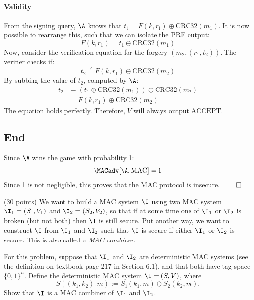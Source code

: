\documentclass[12pt]{article}
\begin{document}
\begin{solution}
\paragraph{Validity} From the signing query, $\A$ knows that $t_1 = F(k, r_1) \oplus \text{CRC32}(m_1)$. 
It is now possible to rearrange this, such that we can isolate the PRF output:
\begin{equation*}
    F(k, r_1) = t_1 \oplus \text{CRC32}(m_1)
\end{equation*}
Now, consider the verification equation for the forgery $(m_2, (r_1, t_2))$. The verifier checks if:
\begin{equation*}
    t_2 \stackrel{?}{=} F(k, r_1) \oplus \text{CRC32}(m_2)
\end{equation*}
By subbing the value of $t_2$, computed by $\A$:
\begin{equation*}
    \begin{aligned}
        t_2 &= (t_1 \oplus \text{CRC32}(m_1)) \oplus \text{CRC32}(m_2) \\
            &= F(k, r_1) \oplus \text{CRC32}(m_2)
    \end{aligned}
\end{equation*}
The equation holds perfectly. Therefore, $V$ will always output $\text{ACCEPT}$.

\subsection*{End}
Since $\A$ wins the game with probability 1:
\begin{equation*}
    \MACadv[\A, \text{MAC}] = 1
\end{equation*}
Since 1 is not negligible, this proves that the MAC protocol is insecure. $\qed$
\end{solution}


  
\begin{problem} (30 points)
We want to build a MAC system $\I$ using two MAC system $\I_1 = (S_1, V_1)$ and $\I_2 = (S_2, V_2)$, so that if at some time one of $\I_1$ or $\I_2$ is broken (but not both) then $\I$ is still secure.
Put another way, we want to construct $\I$ from $\I_1$ and $\I_2$ such that $\I$ is secure if either $\I_1$ or $\I_2$ is secure.
This is also called a \emph{MAC combiner}.

For this problem, suppose that $\I_1$ and $\I_2$ are deterministic MAC systems (see the definition on textbook page 217 in Section 6.1), and that both have tag space $\{0, 1\}^n$.
Define the deterministic MAC system $\I = (S, V)$, where
\[
	S((k_1, k_2), m) := S_1(k_1, m) \oplus S_2(k_2, m).
\]
Show that $\I$ is a MAC combiner of $\I_1$ and $\I_2$.
\end{problem} 
  
\end{document}
